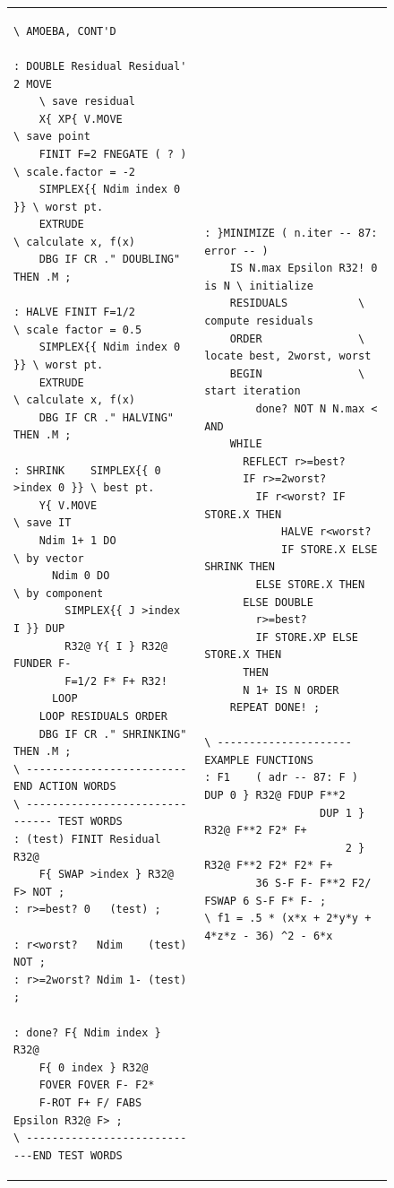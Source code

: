 \begin{figure}[H]
    \centering
    \scriptsize
    \setlength{\tabcolsep}{.4em}
    \begin{tabular}{l|l}
        \begin{lstlisting}
\ AMOEBA, CONT'D

: DOUBLE Residual Residual' 2 MOVE
    \ save residual
    X{ XP{ V.MOVE             \ save point
    FINIT F=2 FNEGATE ( ? )   \ scale.factor = -2
    SIMPLEX{{ Ndim index 0 }} \ worst pt.
    EXTRUDE                   \ calculate x, f(x)
    DBG IF CR ." DOUBLING" THEN .M ;

: HALVE FINIT F=1/2           \ scale factor = 0.5
    SIMPLEX{{ Ndim index 0 }} \ worst pt.
    EXTRUDE                   \ calculate x, f(x)
    DBG IF CR ." HALVING" THEN .M ;

: SHRINK    SIMPLEX{{ 0 >index 0 }} \ best pt.
    Y{ V.MOVE                 \ save IT
    Ndim 1+ 1 DO              \ by vector
      Ndim 0 DO               \ by component
        SIMPLEX{{ J >index I }} DUP
        R32@ Y{ I } R32@ FUNDER F-
        F=1/2 F* F+ R32!
      LOOP
    LOOP RESIDUALS ORDER
    DBG IF CR ." SHRINKING" THEN .M ;
\ ------------------------- END ACTION WORDS
\ ------------------------------- TEST WORDS
: (test) FINIT Residual R32@
    F{ SWAP >index } R32@ F> NOT ;
: r>=best? 0   (test) ;

: r<worst?   Ndim    (test) NOT ;
: r>=2worst? Ndim 1- (test)     ;

: done? F{ Ndim index } R32@
    F{ 0 index } R32@
    FOVER FOVER F- F2*
    F-ROT F+ F/ FABS Epsilon R32@ F> ;
\ ----------------------------END TEST WORDS
        \end{lstlisting}
      &
        \begin{lstlisting}
: }MINIMIZE ( n.iter -- 87: error -- )
    IS N.max Epsilon R32! 0 is N \ initialize
    RESIDUALS           \ compute residuals
    ORDER               \ locate best, 2worst, worst
    BEGIN               \ start iteration
        done? NOT N N.max < AND
    WHILE
      REFLECT r>=best?
      IF r>=2worst?
        IF r<worst? IF STORE.X THEN
            HALVE r<worst?
            IF STORE.X ELSE SHRINK THEN
        ELSE STORE.X THEN
      ELSE DOUBLE
        r>=best?
        IF STORE.XP ELSE STORE.X THEN
      THEN
      N 1+ IS N ORDER
    REPEAT DONE! ;

\ --------------------- EXAMPLE FUNCTIONS
: F1    ( adr -- 87: F ) DUP 0 } R32@ FDUP F**2
                  DUP 1 } R32@ F**2 F2* F+
                      2 } R32@ F**2 F2* F2* F+
        36 S-F F- F**2 F2/ FSWAP 6 S-F F* F- ;
\ f1 = .5 * (x*x + 2*y*y + 4*z*z - 36) ^2 - 6*x


\end{lstlisting}
\end{tabular}
\end{figure}
